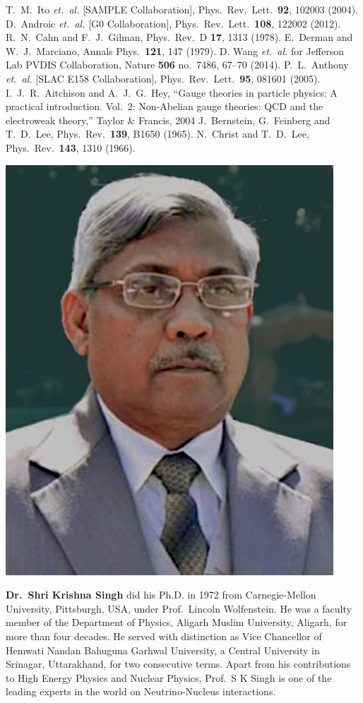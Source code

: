 \begin{thebibliography}{99}
 T.~M.~Ito {\it et.\ al.} [SAMPLE Collaboration], Phys.\ Rev.\ Lett.\  {\bf 92}, 102003 (2004).
 D.~Androic {\it et.\ al.} [G0 Collaboration], Phys.\ Rev.\ Lett.\  {\bf 108}, 122002 (2012).
 R.~N.~Cahn and F.~J.~Gilman, Phys.\ Rev.\ D {\bf 17}, 1313 (1978).
 E.~Derman and W.~J.~Marciano, Annals Phys.\  {\bf 121}, 147 (1979).
 D. Wang {\it et.\ al.} for Jefferson Lab PVDIS Collaboration,   Nature {\bf 506} no.\ 7486, 67--70 (2014). 
 P.~L.~Anthony {\it et.\ al.} [SLAC E158 Collaboration], Phys.\ Rev.\ Lett.\  {\bf 95}, 081601 (2005). 
 I.~J.~R.~Aitchison and A.~J.~G.~Hey, ``Gauge theories in particle physics: A practical introduction. Vol.\ 2: Non-Abelian gauge theories: QCD and the electroweak theory,'' Taylor \& Francis, 2004 
 J.~Bernstein, G.~Feinberg and T.~D.~Lee, Phys.\ Rev.\  {\bf 139}, B1650 (1965).
 N.~Christ and T.~D.~Lee, Phys.\ Rev.\  {\bf 143}, 1310 (1966).
\end{thebibliography}
\vskip 0.5cm
 
\centerline{\includegraphics[scale=.25]{authorsphotos/Prof_S_K_Singh_2.png}} 
\bigskip   

\noindent
\textbf{Dr.\ Shri Krishna Singh} did his Ph.D. in 1972 from Carnegie-Mellon University, Pittsburgh, USA, under Prof.\ Lincoln Wolfenstein. He was a faculty member of the Department of Physics, Aligarh Muslim University, Aligarh, for more than four decades. He served with distinction as Vice Chancellor of Hemwati Nandan Bahuguna Garhwal University, a Central University in Srinagar, Uttarakhand, for two consecutive terms.
Apart from his contributions to High Energy Physics and Nuclear Physics, Prof.\ S K Singh is one of the leading experts in the world on Neutrino-Nucleus interactions.
